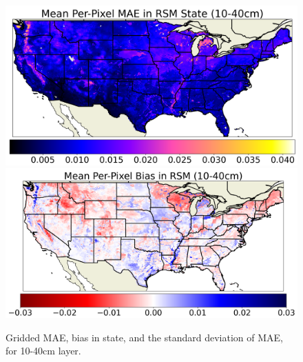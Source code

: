 \begin{figure}[hp!]
    \centering

    \includegraphics[width=.48\linewidth,draft=false]{figures/grid-eval_lstm-rsm-9_full/eval-grid_full_lstm-rsm-9_rsm-40_spatial-stats_abs-err_state-err-abs-mean.png}
    \includegraphics[width=.48\linewidth,draft=false]{figures/grid-eval_lstm-rsm-9_full/eval-grid_full_lstm-rsm-9_rsm-40_spatial-stats_bias_state-err-bias-mean.png}


    \caption{Gridded MAE, bias in state, and the standard deviation of MAE, for 10-40cm layer.}
    \label{lstm-rsm-9-grid-rsm-40}
\end{figure}

